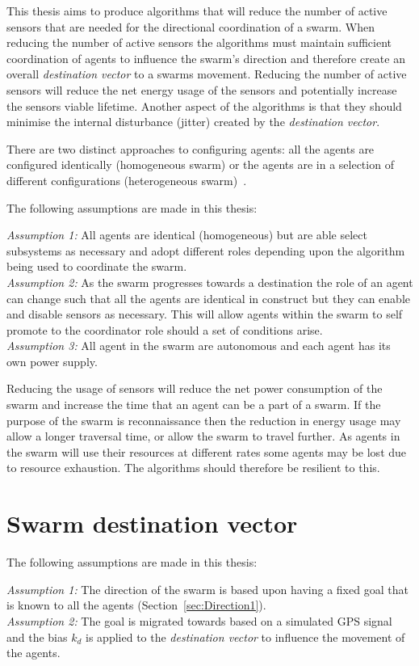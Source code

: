 This thesis aims to produce algorithms that will reduce the number of active sensors that are needed for the directional coordination of a swarm. When reducing the number of active sensors the algorithms must maintain sufficient coordination of agents to influence the swarm's direction and therefore create an overall \textit{destination vector} to a swarms movement. Reducing the number of active sensors will reduce the net energy usage of the sensors and potentially increase the sensors viable lifetime. Another aspect of the algorithms is that they should minimise the internal disturbance (jitter) created by the \textit{destination vector}.

There are two distinct approaches to configuring agents: all the agents are configured identically (homogeneous swarm) or the agents are in a selection of different configurations (heterogeneous swarm)~\cite{BS:13}. 

The following assumptions are made in this thesis:

\textit{Assumption 1:} All agents are identical (homogeneous) but are able select subsystems as necessary and adopt different roles depending upon the algorithm being used to coordinate the swarm. \\
\textit{Assumption 2:} As the swarm progresses towards a destination the role of an agent can change such that all the agents are identical in construct but they can enable and disable sensors as necessary. This will allow agents within the swarm to self promote to the coordinator role should a set of conditions arise.\\
\textit{Assumption 3:} All agent in the swarm are autonomous and each agent has its own power supply. 

Reducing the usage of sensors will reduce the net power consumption of the swarm and increase the time that an agent can be a part of a swarm. If the purpose of the swarm is reconnaissance then the reduction in energy usage may allow a longer traversal time, or allow the swarm to travel further. As agents in the swarm will use their resources at different rates some agents may be lost due to resource exhaustion. The algorithms should therefore be resilient to this.

\section{Swarm destination vector}
The following assumptions are made in this thesis:

\textit{Assumption 1:} The direction of the swarm is based upon having a fixed goal that is known to all the agents (Section~\ref{sec:Direction1}). \\
\textit{Assumption 2:} The goal is migrated towards based on a simulated GPS signal and the bias $k_d$ is applied to the \textit{destination vector} to influence the movement of the agents. 

